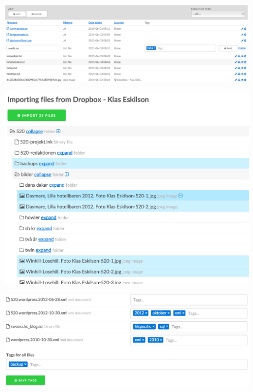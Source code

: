 \begin{Figure}
  \centering
    \includegraphics[width=0.9\linewidth]{figures/screenshots/dump1.png}
\end{Figure}

\begin{Figure}
  \centering
    \includegraphics[width=0.8\linewidth]{figures/screenshots/dump2.png}
\end{Figure}

\begin{Figure}
  \centering
    \includegraphics[width=0.7\linewidth]{figures/screenshots/dump3.png}
\end{Figure}

